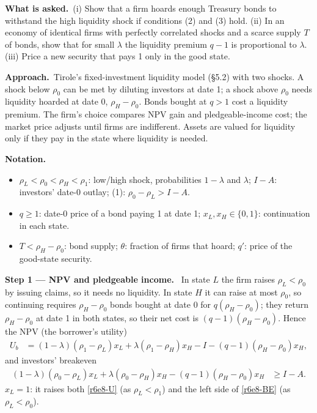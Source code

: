 \documentclass[11pt,a4paper]{article}
\newcommand{\notation}{\par\noindent\textbf{Notation.}}
\newcommand{\step}[2]{\par\medskip\noindent\textbf{Step #1 --- #2.}~}
\newcommand{\asked}{\par\medskip\noindent\textbf{What is asked.}~}
\newcommand{\approach}{\par\smallskip\noindent\textbf{Approach.}~}
\begin{document}
\asked (i) Show that a firm hoards enough Treasury bonds to withstand the high liquidity shock if conditions (2) and (3) hold. (ii) In an economy of identical firms with perfectly correlated shocks and a scarce supply $T$ of bonds, show that for small $\lambda$ the liquidity premium $q-1$ is proportional to $\lambda$. (iii) Price a new security that pays 1 only in the good state.

\approach Tirole's fixed-investment liquidity model (\S 5.2) with two shocks. A shock below $\rho_0$ can be met by diluting investors at date 1; a shock above $\rho_0$ needs liquidity hoarded at date 0, $\rho_H-\rho_0$. Bonds bought at $q>1$ cost a liquidity premium. The firm's choice compares NPV gain and pledgeable-income cost; the market price adjusts until firms are indifferent. Assets are valued for liquidity only if they pay in the state where liquidity is needed.

\notation
\begin{itemize}
  \item $\rho_L<\rho_0<\rho_H<\rho_1$: low/high shock, probabilities $1-\lambda$ and $\lambda$; $I-A$: investors' date-0 outlay; (1): $\rho_0-\rho_L>I-A$.
  \item $q\ge1$: date-0 price of a bond paying 1 at date 1; $x_L,x_H\in\{0,1\}$: continuation in each state.
  \item $T<\rho_H-\rho_0$: bond supply; $\theta$: fraction of firms that hoard; $q'$: price of the good-state security.
\end{itemize}

\step{1}{NPV and pledgeable income} In state $L$ the firm raises $\rho_L<\rho_0$ by issuing claims, so it needs no liquidity. In state $H$ it can raise at most $\rho_0$, so continuing requires $\rho_H-\rho_0$ bonds bought at date 0 for $q(\rho_H-\rho_0)$; they return $\rho_H-\rho_0$ at date 1 in both states, so their net cost is $(q-1)(\rho_H-\rho_0)$. Hence the NPV (the borrower's utility)
\begin{align}
  U_b &= (1-\lambda)(\rho_1-\rho_L)x_L+\lambda(\rho_1-\rho_H)x_H-I-(q-1)(\rho_H-\rho_0)x_H, \label{r6e8-U}
\end{align}
and investors' breakeven
\begin{align}
  (1-\lambda)(\rho_0-\rho_L)x_L+\lambda(\rho_0-\rho_H)x_H-(q-1)(\rho_H-\rho_0)x_H &\ge I-A. \label{r6e8-BE}
\end{align}
$x_L=1$: it raises both \eqref{r6e8-U} (as $\rho_L<\rho_1$) and the left side of \eqref{r6e8-BE} (as $\rho_L<\rho_0$).
\end{document}
